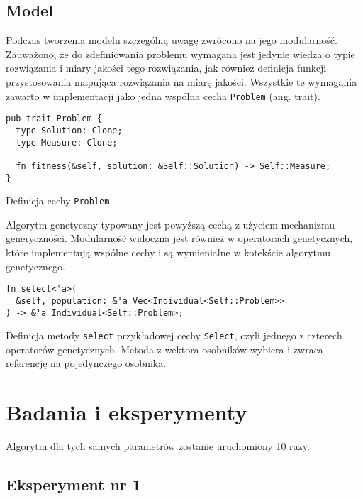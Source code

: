 \documentclass[12pt,a4paper]{article}
\begin{document}
\subsection{Model}

Podczas tworzenia modelu szczególną uwagę zwrócono na jego modularność. Zauważono, że do zdefiniowania problemu wymagana jest jedynie wiedza o typie rozwiązania i miary jakości tego rozwiązania, jak również definicja funkcji przystosowania mapująca rozwiązania na miarę jakości. Wszystkie te wymagania zawarto w implementacji jako jedna wspólna cecha \texttt{Problem} (ang. trait).
\begin{listing}[H]
  \begin{verbatim}
pub trait Problem {
  type Solution: Clone;
  type Measure: Clone;

  fn fitness(&self, solution: &Self::Solution) -> Self::Measure;
}
  \end{verbatim}
  \caption{Definicja cechy \texttt{Problem}.}
\end{listing}
Algorytm genetyczny typowany jest powyższą cechą z użyciem mechanizmu generyczności. Modularność widoczna jest również w operatorach genetycznych, które implementują wspólne cechy i są wymienialne w kotekście algorytmu genetycznego.
\begin{listing}[H]
  \begin{verbatim}
fn select<'a>(
  &self, population: &'a Vec<Individual<Self::Problem>>
) -> &'a Individual<Self::Problem>;
  \end{verbatim}
  \caption{Definicja metody \texttt{select} przykładowej cechy \texttt{Select}, czyli jednego z czterech operatorów genetycznych. Metoda z wektora osobników wybiera i zwraca referencję na pojedynczego osobnika.}
\end{listing}

\section{Badania i eksperymenty}

Algorytm dla tych samych parametrów zostanie uruchomiony 10 razy.

\subsection{Eksperyment nr 1}
\end{document}
